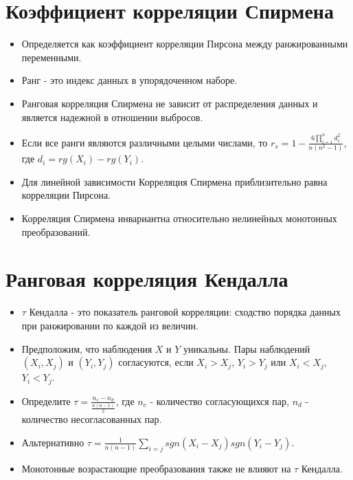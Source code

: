 \documentclass{article}
\begin{document}
\section{Коэффициент корреляции Спирмена}
\begin{itemize}
\item Определяется как коэффициент корреляции Пирсона между ранжированными переменными.
\item Ранг - это индекс данных в упорядоченном наборе.
\item Ранговая корреляция Спирмена не зависит от распределения данных и является надежной в отношении выбросов.
\item Если все ранги являются различными целыми числами, то \(r_s = 1 - \frac{6\prod_{i=1}^n{d_i^2}}{n(n^2-1)}\), где \(d_i = rg(X_i) - rg(Y_i)\).
\item Для линейной зависимости Корреляция Спирмена приблизительно равна корреляции Пирсона.
\item Корреляция Спирмена инвариантна относительно нелинейных монотонных преобразований.
\end{itemize}

\section{Ранговая корреляция Кендалла}
\begin{itemize}
\item $\tau$ Кендалла - это показатель ранговой корреляции: сходство порядка данных при ранжировании по каждой из величин.
\item Предположим, что наблюдения $X$ и $Y$ уникальны. Пары наблюдений $(X_i, X_j)$ и $(Y_i, Y_j)$ согласуются, если $X_i > X_j$, $Y_i > Y_j$ или $X_i < X_j$, $Y_i < Y_j$. 
\item Определите \(\tau = \frac{n_c - n_d}{\frac{n(n-1)}{2}}\), где $n_c$ - количество согласующихся пар, $n_d$ - количество несогласованных пар.
\item Альтернативно \(\tau = \frac{1}{n(n-1)}\sum_{i=j}sgn(X_i - X_j)sgn(Y_i - Y_j)\).
\item Монотонные возрастающие преобразования также не влияют на
\(\tau\) Кендалла.
\end{itemize}
\end{document}
